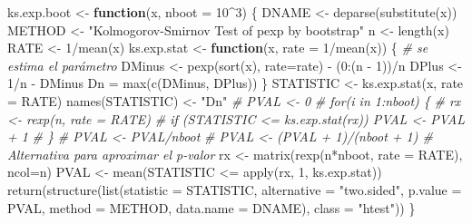 \documentclass[
]{book}
\newenvironment{Shaded}{\begin{snugshade}}{\end{snugshade}}
\newcommand{\AttributeTok}[1]{\textcolor[rgb]{0.77,0.63,0.00}{#1}}
\newcommand{\CommentTok}[1]{\textcolor[rgb]{0.56,0.35,0.01}{\textit{#1}}}
\newcommand{\ControlFlowTok}[1]{\textcolor[rgb]{0.13,0.29,0.53}{\textbf{#1}}}
\newcommand{\DecValTok}[1]{\textcolor[rgb]{0.00,0.00,0.81}{#1}}
\newcommand{\FunctionTok}[1]{\textcolor[rgb]{0.00,0.00,0.00}{#1}}
\newcommand{\NormalTok}[1]{#1}
\newcommand{\OtherTok}[1]{\textcolor[rgb]{0.56,0.35,0.01}{#1}}
\newcommand{\SpecialCharTok}[1]{\textcolor[rgb]{0.00,0.00,0.00}{#1}}
\newcommand{\StringTok}[1]{\textcolor[rgb]{0.31,0.60,0.02}{#1}}
\theoremstyle{break}
\theoremstyle{definition}
\theoremstyle{definition}
\theoremstyle{definition}
\theoremstyle{definition}
\theoremstyle{remark}
\begin{document}
\begin{Shaded}
\begin{Highlighting}[]
\NormalTok{ks.exp.boot }\OtherTok{\textless{}{-}} \ControlFlowTok{function}\NormalTok{(x, }\AttributeTok{nboot =} \DecValTok{10}\SpecialCharTok{\^{}}\DecValTok{3}\NormalTok{) \{}
\NormalTok{  DNAME }\OtherTok{\textless{}{-}} \FunctionTok{deparse}\NormalTok{(}\FunctionTok{substitute}\NormalTok{(x))}
\NormalTok{  METHOD }\OtherTok{\textless{}{-}} \StringTok{"Kolmogorov{-}Smirnov Test of pexp by bootstrap"} 
\NormalTok{  n }\OtherTok{\textless{}{-}} \FunctionTok{length}\NormalTok{(x)}
\NormalTok{  RATE }\OtherTok{\textless{}{-}} \DecValTok{1}\SpecialCharTok{/}\FunctionTok{mean}\NormalTok{(x)}
\NormalTok{  ks.exp.stat }\OtherTok{\textless{}{-}} \ControlFlowTok{function}\NormalTok{(x, }\AttributeTok{rate =} \DecValTok{1}\SpecialCharTok{/}\FunctionTok{mean}\NormalTok{(x)) \{ }\CommentTok{\# se estima el parámetro}
\NormalTok{    DMinus }\OtherTok{\textless{}{-}} \FunctionTok{pexp}\NormalTok{(}\FunctionTok{sort}\NormalTok{(x), }\AttributeTok{rate=}\NormalTok{rate) }\SpecialCharTok{{-}}\NormalTok{ (}\DecValTok{0}\SpecialCharTok{:}\NormalTok{(n }\SpecialCharTok{{-}} \DecValTok{1}\NormalTok{))}\SpecialCharTok{/}\NormalTok{n}
\NormalTok{    DPlus }\OtherTok{\textless{}{-}} \DecValTok{1}\SpecialCharTok{/}\NormalTok{n }\SpecialCharTok{{-}}\NormalTok{ DMinus}
\NormalTok{    Dn }\OtherTok{=} \FunctionTok{max}\NormalTok{(}\FunctionTok{c}\NormalTok{(DMinus, DPlus))}
\NormalTok{  \}  }
\NormalTok{  STATISTIC }\OtherTok{\textless{}{-}} \FunctionTok{ks.exp.stat}\NormalTok{(x, }\AttributeTok{rate =}\NormalTok{ RATE) }
  \FunctionTok{names}\NormalTok{(STATISTIC) }\OtherTok{\textless{}{-}} \StringTok{"Dn"}
  \CommentTok{\# PVAL \textless{}{-} 0}
  \CommentTok{\# for(i in 1:nboot) \{}
  \CommentTok{\#   rx \textless{}{-} rexp(n, rate = RATE)}
  \CommentTok{\#   if (STATISTIC \textless{}= ks.exp.stat(rx)) PVAL \textless{}{-} PVAL + 1}
  \CommentTok{\# \}}
  \CommentTok{\# PVAL \textless{}{-} PVAL/nboot}
  \CommentTok{\# PVAL \textless{}{-} (PVAL + 1)/(nboot + 1) \# Alternativa para aproximar el p{-}valor}
\NormalTok{  rx }\OtherTok{\textless{}{-}} \FunctionTok{matrix}\NormalTok{(}\FunctionTok{rexp}\NormalTok{(n}\SpecialCharTok{*}\NormalTok{nboot, }\AttributeTok{rate =}\NormalTok{ RATE), }\AttributeTok{ncol=}\NormalTok{n)}
\NormalTok{  PVAL }\OtherTok{\textless{}{-}} \FunctionTok{mean}\NormalTok{(STATISTIC }\SpecialCharTok{\textless{}=} \FunctionTok{apply}\NormalTok{(rx, }\DecValTok{1}\NormalTok{, ks.exp.stat))}
  \FunctionTok{return}\NormalTok{(}\FunctionTok{structure}\NormalTok{(}\FunctionTok{list}\NormalTok{(}\AttributeTok{statistic =}\NormalTok{ STATISTIC, }\AttributeTok{alternative =} \StringTok{"two.sided"}\NormalTok{, }
                   \AttributeTok{p.value =}\NormalTok{ PVAL, }\AttributeTok{method =}\NormalTok{ METHOD, }\AttributeTok{data.name =}\NormalTok{ DNAME), }
                   \AttributeTok{class =} \StringTok{"htest"}\NormalTok{))}
\NormalTok{\}}
\end{Highlighting}
\end{Shaded}
\end{document}

